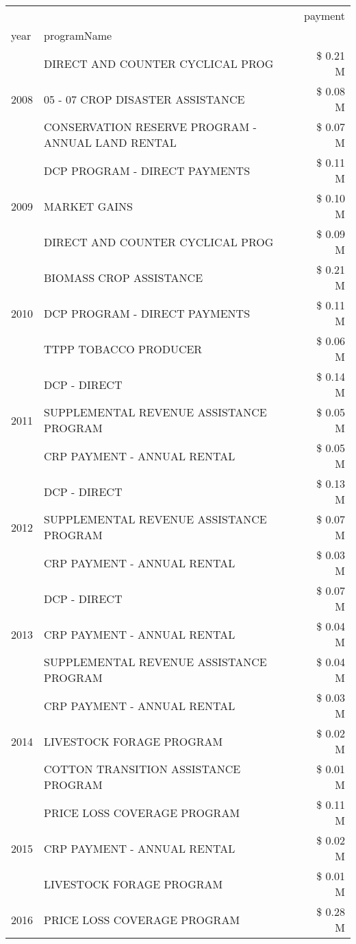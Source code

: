 \begin{tabular}{llr}
\toprule
 &  & payment \\
year & programName &  \\
\midrule
\multirow[t]{3}{*}{2008} & DIRECT AND COUNTER CYCLICAL PROG & \$ 0.21 M \\
 & 05 - 07 CROP DISASTER ASSISTANCE & \$ 0.08 M \\
 & CONSERVATION RESERVE PROGRAM - ANNUAL LAND RENTAL & \$ 0.07 M \\
\cline{1-3}
\multirow[t]{3}{*}{2009} & DCP PROGRAM - DIRECT PAYMENTS & \$ 0.11 M \\
 & MARKET GAINS & \$ 0.10 M \\
 & DIRECT AND COUNTER CYCLICAL PROG & \$ 0.09 M \\
\cline{1-3}
\multirow[t]{3}{*}{2010} & BIOMASS CROP ASSISTANCE & \$ 0.21 M \\
 & DCP PROGRAM - DIRECT PAYMENTS & \$ 0.11 M \\
 & TTPP TOBACCO PRODUCER & \$ 0.06 M \\
\cline{1-3}
\multirow[t]{3}{*}{2011} & DCP - DIRECT & \$ 0.14 M \\
 & SUPPLEMENTAL REVENUE ASSISTANCE PROGRAM & \$ 0.05 M \\
 & CRP PAYMENT - ANNUAL RENTAL & \$ 0.05 M \\
\cline{1-3}
\multirow[t]{3}{*}{2012} & DCP - DIRECT & \$ 0.13 M \\
 & SUPPLEMENTAL REVENUE ASSISTANCE PROGRAM & \$ 0.07 M \\
 & CRP PAYMENT - ANNUAL RENTAL & \$ 0.03 M \\
\cline{1-3}
\multirow[t]{3}{*}{2013} & DCP - DIRECT & \$ 0.07 M \\
 & CRP PAYMENT - ANNUAL RENTAL & \$ 0.04 M \\
 & SUPPLEMENTAL REVENUE ASSISTANCE PROGRAM & \$ 0.04 M \\
\cline{1-3}
\multirow[t]{3}{*}{2014} & CRP PAYMENT - ANNUAL RENTAL & \$ 0.03 M \\
 & LIVESTOCK FORAGE PROGRAM & \$ 0.02 M \\
 & COTTON TRANSITION ASSISTANCE PROGRAM & \$ 0.01 M \\
\cline{1-3}
\multirow[t]{3}{*}{2015} & PRICE LOSS COVERAGE PROGRAM & \$ 0.11 M \\
 & CRP PAYMENT - ANNUAL RENTAL & \$ 0.02 M \\
 & LIVESTOCK FORAGE PROGRAM & \$ 0.01 M \\
\cline{1-3}
\multirow[t]{3}{*}{2016} & PRICE LOSS COVERAGE PROGRAM                   & \$ 0.28 M \\

\end{tabular}
